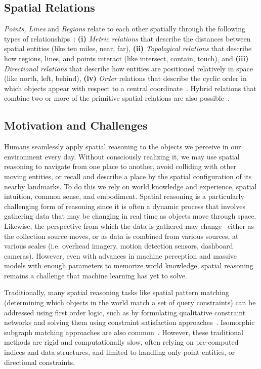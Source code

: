 \subsection{Spatial Relations}
\textit{Points, Lines} and \textit{Regions} relate to each other spatially through the following types of relationships~\cite{Carniel2020,Bertella2022,Carniel2023}: 
\textbf{(i)} \textit{Metric relations} that describe the distances between spatial entities (like ten miles, near, far), 
\textbf{(ii)} \textit{Topological relations} that describe how regions, lines, and points interact (like intersect, contain, touch), and 
\textbf{(iii)} \textit{Directional relations} that describe how entities are positioned relatively in space (like north, left, behind),
\textbf{(iv)} \textit{Order} relations that describe the cyclic order in which objects appear with respect to a central coordinate~\cite{Schwering2014}.
%
Hybrid relations that combine two or more of the primitive spatial relations are also possible~\cite{Carniel2023}.



\subsection{Motivation and Challenges}
Humans seamlessly apply spatial reasoning to the objects we perceive in our environment every day.
Without consciously realizing it, we may use spatial reasoning to navigate from one place to another, avoid colliding with other moving entities, or recall and describe a place by the spatial configuration of its nearby landmarks.
To do this we rely on world knowledge and experience, spatial intuition, common sense, and embodiment.
Spatial reasoning is a particularly challenging form of reasoning since it is often a dynamic process that involves gathering data that may be changing in real time as objects move through space.
Likewise, the perspective from which the data is gathered may change-- either as the collection source moves, or as data is combined from various sources, at various scales (i.e. overhead imagery, motion detection sensors, dashboard cameras).
However, even with advances in machine perception and massive models with enough parameters to memorize world knowledge, spatial reasoning remains a challenge that machine learning has yet to solve.

Traditionally, many spatial reasoning tasks like spatial pattern matching (determining which objects in the world match a set of query constraints) can be addressed using first order logic, such as by formulating qualitative constraint networks and solving them using constraint satisfaction approaches~\cite{Papadias1998, Schwering2014, Duckham2023}.
Isomorphic subgraph matching approaches are also common~\cite{Folkers2000, Chen2019, Fang2019}.
However, these traditional methods are rigid and computationally slow, often relying on pre-computed indices and data structures, and limited to handling only point entities, or directional constraints.



